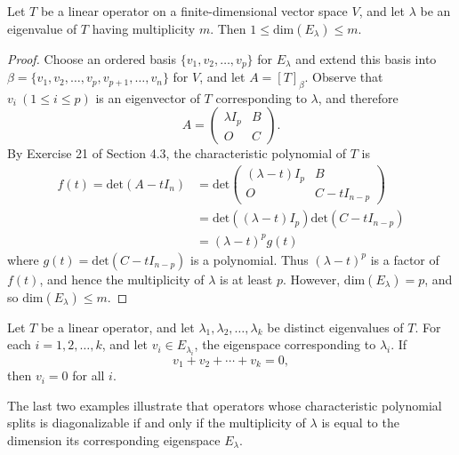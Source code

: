 \begin{theorem}\label{Theorem 5.7}
    Let \( T  \) be a linear operator on a finite-dimensional vector space \( V  \), and let \( \lambda  \) be an eigenvalue of \( T  \) having multiplicity \(  m  \). Then \( 1 \leq \text{dim}({E}_{\lambda}) \leq  m \).
\end{theorem} 
\begin{proof}
    Choose an ordered basis \( \{ {v}_{1}, {v}_{2}, \dots, {v}_{p} \}   \) for \( {E}_{\lambda} \) and extend this basis into \( \beta = \{ {v}_{1}, {v}_{2}, \dots ,{v}_{p}, {v}_{p+1}, \dots, {v}_{n} \}   \) for \( V  \), and let \( A = [T]_{\beta} \). Observe that \( {v}_{i} \ (1 \leq i \leq p ) \) is an eigenvector of \( T  \) corresponding to \( \lambda  \), and therefore 
    \[  A = \begin{pmatrix} 
        \lambda {I}_{p} & B \\
        O & C 
              \end{pmatrix}.   \]
By Exercise 21 of Section 4.3, the characteristic polynomial of \( T  \) is
\begin{align*}
    f(t) = \text{det}(A - t {I}_{n}) &= \text{det}\begin{pmatrix} 
        (\lambda - t){I}_{p} & B  \\
        O & C - t {I}_{n-p}
              \end{pmatrix}  \\
              &= \text{det}((\lambda -t){I}_{p}) \text{det}(C - {tI}_{n-p}) \\
              &= (\lambda - t)^{p} g(t)
\end{align*}
where \( g(t) = \text{det}(C - {tI}_{n-p}) \) is a polynomial. Thus \( (\lambda - t)^{p} \) is a factor of \( f(t)  \), and hence the multiplicity of \( \lambda  \) is at least \( p  \). However, \( \text{dim}({E}_{\lambda}) = p  \), and so \( \text{dim}({E}_{\lambda}) \leq m \).
\end{proof}

\begin{lemma}
    Let \( T  \) be a linear operator, and let \( {\lambda}_{1}, {\lambda}_{2}, \dots, {\lambda}_{k} \) be distinct eigenvalues of \( T  \). For each \( i = 1,2,\dots,k  \), and let \( {v}_{i} \in {E}_{{\lambda}_{i}}  \), the eigenspace corresponding to \( {\lambda}_{i} \). If
    \[  {v}_{1} + {v}_{2} + \cdots + {v}_{k} = 0, \]
    then \( {v}_{i} = 0  \) for all \( i \).
\end{lemma}

The last two examples illustrate that operators whose characteristic polynomial splits is diagonalizable if and only if the multiplicity of \( \lambda \) is equal to the dimension its corresponding eigenspace \( {E}_{\lambda} \).

